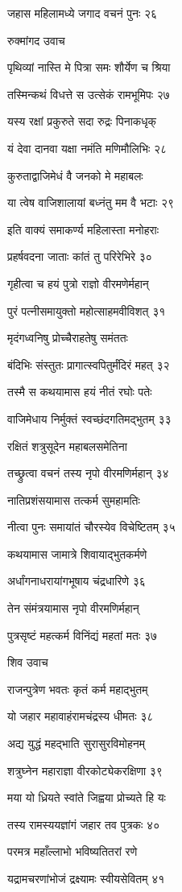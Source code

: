 जहास महिलामध्ये जगाद वचनं पुनः २६

रुक्मांगद उवाच

पृथिव्यां नास्ति मे पित्रा समः शौर्येण च श्रिया

तस्मिन्कथं विधत्ते स उत्सेकं रामभूमिपः २७

यस्य रक्षां प्रकुरुते सदा रुद्रः पिनाकधृक्

यं देवा दानवा यक्षा नमंति मणिमौलिभिः २८

कुरुताद्वाजिमेधं वै जनको मे महाबलः

या त्वेष वाजिशालायां बध्नंतु मम वै भटाः २९

इति वाक्यं समाकर्ण्य महिलास्ता मनोहराः

प्रहर्षवदना जाताः कांतं तु परिरेभिरे ३०

गृहीत्वा च हयं पुत्रो राज्ञो वीरमणेर्महान्

पुरं पत्नीसमायुक्तो महोत्साहमवीविशत् ३१

मृदंगध्वनिषु प्रोच्चैराहतेषु समंततः

बंदिभिः संस्तुतः प्रागात्स्वपितुर्मंदिरं महत् ३२

तस्मै स कथयामास हयं नीतं रघोः पतेः

वाजिमेधाय निर्मुक्तं स्वच्छंदगतिमद्भुतम् ३३

रक्षितं शत्रुसूदेन महाबलसमेतिना

तच्छ्रुत्वा वचनं तस्य नृपो वीरमणिर्महान् ३४

नातिप्रशंसयामास तत्कर्म सुमहामतिः

नीत्वा पुनः समायांतं चौरस्येव विचेष्टितम् ३५

कथयामास जामात्रे शिवायाद्भुतकर्मणे

अर्धांगनाधरायांगभूषाय चंद्रधारिणे ३६

तेन संमंत्रयामास नृपो वीरमणिर्महान्

पुत्रसृष्टं महत्कर्म विनिंद्यं महतां मतः ३७

शिव उवाच

राजन्पुत्रेण भवतः कृतं कर्म महाद्भुतम्

यो जहार महावाहंरामचंद्रस्य धीमतः ३८

अद्य युद्धं महद्भाति सुरासुरविमोहनम्

शत्रुघ्नेन महाराज्ञा वीरकोट्येकरक्षिणा ३९

मया यो ध्रियते स्वांते जिह्वया प्रोच्यते हि यः

तस्य रामस्ययज्ञांगं जहार तव पुत्रकः ४०

परमत्र महाँल्लाभो भविष्यतितरां रणे

यद्रामचरणांभोजं द्रक्ष्यामः स्वीयसेवितम् ४१

